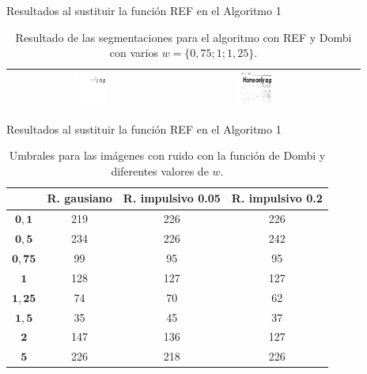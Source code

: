 \documentclass{beamer}
\theoremstyle{plain} %
\theoremstyle{definition}
\newcommand{\bb}{\bfseries}
\begin{document}
\begin{frame}{Resultados al sustituir la función REF en el Algoritmo 1}
\begin{table}
\begin{tabular}{c||c|c|c}
  \includegraphics[width=0.2\textwidth]{img/res/e1a/alg1tipo6d0.75-09.jpg} &
  \includegraphics[width=0.2\textwidth]{img/res/e1a/alg1tipo6d1.25-09.jpg} \\\hline
  \end{tabular}
  \caption{Resultado de las segmentaciones para el algoritmo con REF y Dombi con varios $w = \{0,75; 1; 1,25\}$.\label{tab:resultexp1imagenesdombi}}
  \end{table}
\end{frame}

\begin{frame}{Resultados al sustituir la función REF en el Algoritmo 1}
  \begin{table}
  \centering
  \begin{tabular}{c||c|c|c}
             &\bb R. gausiano&\bb R. impulsivo 0.05&\bb R. impulsivo 0.2\\\hline\hline
  $\mathbf{0,1}$  &   219   &    226    &     226     \\\hline
  $\mathbf{0,5}$  &   234   &    226    &     242     \\\hline
  $\mathbf{0,75}$ &    99   &     95    &      95     \\\hline
  $\mathbf{1}$    &   128   &    127    &     127     \\\hline
  $\mathbf{1,25}$ &    74   &     70    &      62     \\\hline
  $\mathbf{1,5}$  &    35   &     45    &      37     \\\hline
  $\mathbf{2}$    &   147   &    136    &     127     \\\hline
  $\mathbf{5}$    &   226   &    218    &     226     \\\hline
  \end{tabular}
  \caption{Umbrales para las imágenes con ruido con la función de Dombi y diferentes valores de $w$.\label{tab:resultexp1ruido}}
  \end{table}
\end{frame}
\end{document}
